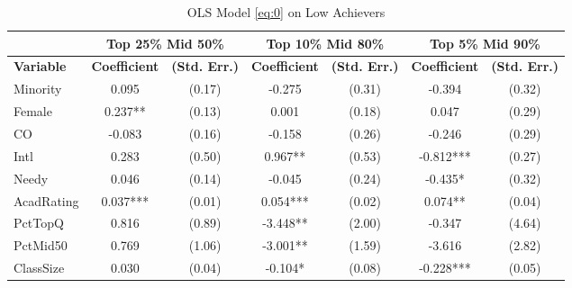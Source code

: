 \begin{sidewaystable}[htb]\centering
  \begin{threeparttable}
    \caption{OLS Model \eqref{eq:0} on Low Achievers}\label{table:c2}
    \begin{tabular}{l|c|c|c|c|c|c}
      \hline\hline 
                        & \multicolumn{2}{|c|}{Top 25\% Mid 50\%} & \multicolumn{2}{|c|}{Top 10\% Mid 80\%} & \multicolumn{2}{|c}{Top 5\% Mid 90\%} \\
      \hline
      \textbf{Variable} & \textbf{Coefficient}         & \textbf{(Std. Err.)}         & \textbf{Coefficient} & \textbf{(Std. Err.)} & \textbf{Coefficient} & \textbf{(Std. Err.)} \\ 
      \hline
      \hline 
      Minority            &       0.095                       &      (0.17)   &      -0.275                       &      (0.31)   &      -0.394                       &      (0.32)   \\
      Female              &       0.237**                     &      (0.13)   &       0.001                       &      (0.18)   &       0.047                       &      (0.29)   \\
      CO                  &      -0.083                       &      (0.16)   &      -0.158                       &      (0.26)   &      -0.246                       &      (0.29)   \\
      Intl                &       0.283                       &      (0.50)   &       0.967**                     &      (0.53)   &      -0.812***                    &      (0.27)   \\
      Needy               &       0.046                       &      (0.14)   &      -0.045                       &      (0.24)   &      -0.435*                      &      (0.32)   \\
      AcadRating          &       0.037***                    &      (0.01)   &       0.054***                    &      (0.02)   &       0.074**                     &      (0.04)   \\
      PctTopQ             &       0.816                       &      (0.89)   &      -3.448**                     &      (2.00)   &      -0.347                       &      (4.64)   \\
      PctMid50            &       0.769                       &      (1.06)   &      -3.001**                     &      (1.59)   &      -3.616                       &      (2.82)   \\
      ClassSize           &       0.030                       &      (0.04)   &      -0.104*                      &      (0.08)   &      -0.228***                    &      (0.05)   \\

\end{tabular}
\end{threeparttable}
\end{sidewaystable}
